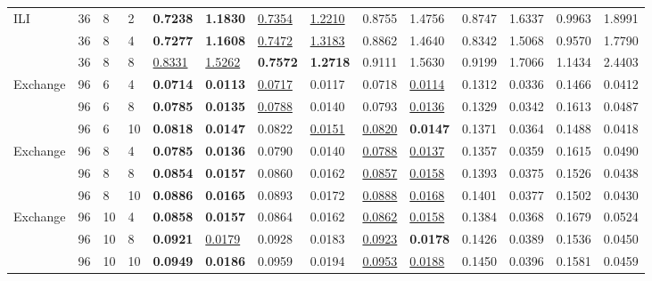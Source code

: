{\begin{table}[tb]
{\begin{tabular}{p{10mm}p{6mm}p{6mm}p{6mm}p{8mm}p{8mm}p{8mm}p{8mm}p{8mm}p{8mm}p{8mm}p{8mm}p{8mm}p{8mm}}
\midrule
\multirow{3}{*}{ILI} 
&36 &8 &2 &\textbf{0.7238}  &\textbf{1.1830} &\underline{0.7354} &\underline{1.2210} &0.8755   &1.4756 &0.8747 &	1.6337   &0.9963  &1.8991 \\

&36 &8 &4 &\textbf{0.7277}  &\textbf{1.1608} &\underline{0.7472} &\underline{1.3183} &0.8862   &1.4640 &0.8342 &	1.5068   &0.9570  &1.7790 \\

&36 &8 &8 &\underline{0.8331} &\underline{1.5262} &\textbf{0.7572} &\textbf{1.2718} &0.9111   &1.5630 &0.9199 &1.7066  &1.1434  &2.4403 \\


\midrule


\multirow{3}{*}{Exchange} 
&96  &6&4 &\textbf{0.0714}   &\textbf{0.0113} &\underline{0.0717}&0.0117 &0.0718 
   &\underline{0.0114} &0.1312 &	0.0336  &0.1466   &0.0412 \\

&96&6 &8 & \textbf{0.0785}&\textbf{0.0135}&\underline{0.0788}&{0.0140}&0.0793 &\underline{0.0136}&0.1329 &	0.0342  &0.1613 &0.0487 
\\

&96 &6 &10& \textbf{0.0818}&\textbf{0.0147}&0.0822&\underline{0.0151}&\underline{0.0820}&\textbf{0.0147}&0.1371 &	0.0364 & 0.1488 &0.0418 
\\
\midrule
\multirow{3}{*}{Exchange} 
&96  &8&4 &\textbf{0.0785}   &\textbf{0.0136} &0.0790 &0.0140 
 &\underline{0.0788} 
   &\underline{0.0137} &0.1357 &0.0359 &0.1615   &0.0490\\

&96&8 &8 & \textbf{0.0854}&\textbf{0.0157}&0.0860 
&0.0162 &\underline{0.0857} &\underline{0.0158}&0.1393 &0.0375 &0.1526  &0.0438  
\\

&96 &8 &10& \textbf{0.0886}&\textbf{0.0165}&0.0893 &0.0172&\underline{0.0888}&\underline{0.0168}&0.1401 &0.0377 &0.1502 &0.0430
\\

\midrule
\multirow{3}{*}{Exchange} 
&96  &10&4 &\textbf{0.0858}&\textbf{0.0157}&0.0864&0.0162&\underline{0.0862}&\underline{0.0158}&0.1384 &0.0368 &0.1679 &0.0524\\

&96&10 &8& \textbf{0.0921}&\underline{0.0179}&0.0928&0.0183&\underline{0.0923}&\textbf{0.0178}&0.1426 &0.0389 &0.1536&0.0450
\\

&96 &10 &10&\textbf{0.0949}&\textbf{0.0186} &0.0959&0.0194&\underline{0.0953}&\underline{0.0188}&0.1450 &0.0396  &0.1581 &0.0459 \\




                             \bottomrule

\end{tabular}
}
\end{table}
}

